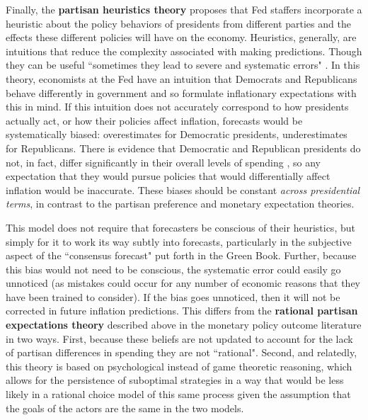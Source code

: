 \documentclass[a4paper]{article}\usepackage{graphicx, color}
\begin{document}
Finally, the {\bf{partisan heuristics theory}} proposes that Fed staffers incorporate a heuristic \citep[see][]{kahneman1973, tverskykahneman1974, kahneman2003} about the policy behaviors of presidents from different parties and the effects these different policies will have on the economy. Heuristics, generally, are intuitions that reduce the complexity associated with making predictions. Though they can be useful ``sometimes they lead to severe and systematic errors" \citep[][1124]{tverskykahneman1974}. In this theory, economists at the Fed have an intuition that Democrats and Republicans behave differently in government and so formulate inflationary expectations with this in mind. If this intuition does not accurately correspond to how presidents actually act, or how their policies affect inflation, forecasts would be systematically biased: overestimates for Democratic presidents, underestimates for Republicans. There is evidence that Democratic and Republican presidents do not, in fact, differ significantly in their overall levels of spending \citep{Bartels2008}, so any expectation that they would pursue policies that would differentially affect inflation would be inaccurate. These biases should be constant {\emph{across presidential terms}}, in contrast to the partisan preference and monetary expectation theories.

This model does not require that forecasters be conscious of their heuristics, but simply for it to work its way subtly into forecasts, particularly in the subjective aspect of the ``consensus forecast" put forth in the Green Book. Further, because this bias would not need to be conscious, the systematic error could easily go unnoticed (as mistakes could occur for any number of economic reasons that they have been trained to consider). If the bias goes unnoticed, then it will not be corrected in future inflation predictions. This differs from the {\bf{rational partisan expectations theory}} described above in the monetary policy outcome literature in two ways. First, because these beliefs are not updated to account for the lack of partisan differences in spending they are not ``rational". Second, and relatedly, this theory is based on psychological instead of game theoretic reasoning, which allows for the persistence of suboptimal strategies in a way that would be less likely in a rational choice model of this same process given the assumption that the goals of the actors are the same in the two models. %
\end{document}
